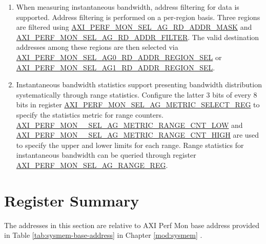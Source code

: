 \documentclass[main\_\_EN.tex]{subfiles}
\begin{document}
\begin{enumerate}
    \item When measuring instantaneous bandwidth, address filtering for data is supported. Address filtering is performed on a per-region basis. Three regions are filtered using \hyperref[fielddesc:AXIPERFMONSELAGNRDADDRMASKM]{AXI\_PERF\_MON\_SEL\_AG\_RD\_ADDR\_MASK} and \hyperref[fielddesc:AXIPERFMONSELAGNRDADDRFILTERM]{AXI\_PERF\_MON\_SEL\_AG\_RD\_ADDR\_FILTER}. The valid destination addresses among these regions are then selected via \hyperref[fielddesc:AXIPERFMONSELAG0RDADDRREGIONSEL]{AXI\_PERF\_MON\_SEL\_AG0\_RD\_ADDR\_REGION\_SEL} or \hyperref[fielddesc:AXIPERFMONSELAG1RDADDRREGIONSEL]{AXI\_PERF\_MON\_SEL\_AG1\_RD\_ADDR\_REGION\_SEL}.
    \item Instantaneous bandwidth statistics support presenting bandwidth distribution systematically through range statistics. Configure the latter 3 bits of every 8 bits in register \hyperref[regdesc:AXIPERFMONSELAGNMETRICSELECTMREG]{AXI\_PERF\_MON\_SEL\_AG\_METRIC\_SELECT\_REG} to specify the statistics metric for range counters. \hyperref[fielddesc:AXIPERFMONSELAGNMETRICRANGEMCNTLOW]{AXI\_PERF\_MON\_\_SEL\_AG\_METRIC\_RANGE\_CNT\_LOW} and \hyperref[fielddesc:AXIPERFMONSELAGNMETRICRANGEMCNTHIGH]{AXI\_PERF\_MON\_\_SEL\_AG\_METRIC\_RANGE\_CNT\_HIGH} 
    are used to specify the upper and lower limits for each range. Range statistics for instantaneous bandwidth can be queried through register \hyperref[regdesc:AXIPERFMONSELAGNRANGEMREG]{AXI\_PERF\_MON\_SEL\_AG\_RANGE\_REG}.
\end{enumerate}





\newpage
\hypertarget{aximon-reg-summ}{}
\section{Register Summary}
\label{sec:aximon-reg-summ}

The addresses in this section are relative to AXI Perf Mon base address provided in Table \ref{tab:sysmem-base-address} in Chapter \ref{mod:sysmem} \textit{}.
\end{document}
